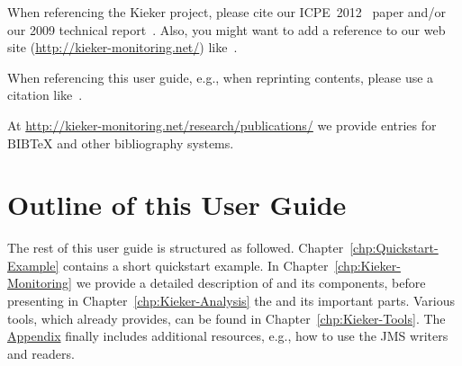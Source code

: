 		\begin{compactitem}
			\item 
			When referencing the Kieker project, please cite our ICPE~2012~\cite{KiekerICPE2012} paper and/or our 2009 technical report~\cite{vanHoornRohrHasselbringWallerEhlersFreyKieselhorst2009TRContinuousMonitoringOfSoftwareServicesDesignAndApplicationOfTheKiekerFramework}. Also, you might want to add a reference to our web site (\url{http://kieker-monitoring.net/}) like~\cite{KiekerWebSite}. 
			\item 
			When referencing this user guide, e.g., when reprinting contents, please use a citation like~\cite{Kieker1.7UserGuide}.
		\end{compactitem}

		\noindent At \url{http://kieker-monitoring.net/research/publications/} we provide entries for $\mathrm{B\scriptstyle IB}\!$\TeX{} and other bibliography systems.
		
	\section{Outline of this User Guide}
		The rest of this user guide is structured as followed. Chapter~\ref{chp:Quickstart-Example} contains a short quickstart example. In Chapter~\ref{chp:Kieker-Monitoring} we provide a detailed description of \KiekerMonitoringPart{} and its components, before presenting in Chapter~\ref{chp:Kieker-Analysis} the \KiekerAnalysisPart{} and its important parts. Various tools, which \Kieker{} already provides, can be found in Chapter~\ref{chp:Kieker-Tools}. The \hyperlink{hypertarget:appendix}{Appendix} finally includes additional resources, e.g., how to use the JMS writers and readers.
